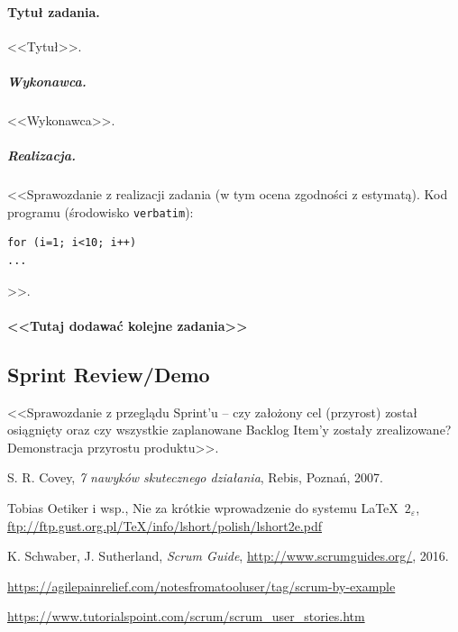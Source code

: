 \documentclass[a4paper]{article}
\begin{document}
\paragraph{Tytuł zadania.} <<Tytuł>>.
\subparagraph{Wykonawca.} <<Wykonawca>>.
\subparagraph{Realizacja.} <<Sprawozdanie z realizacji zadania (w tym ocena zgodności z estymatą). Kod programu (środowisko \texttt{verbatim}): \begin{verbatim}
for (i=1; i<10; i++)
...
\end{verbatim}>>.

\paragraph{<<Tutaj dodawać kolejne zadania>>}


\subsection{Sprint Review/Demo}
<<Sprawozdanie z przeglądu Sprint'u -- czy założony cel (przyrost) został osiągnięty oraz czy wszystkie zaplanowane Backlog Item'y zostały zrealizowane? Demonstracja przyrostu produktu>>.

\begin{thebibliography}{9}

 S. R. Covey, {\em 7 nawyków skutecznego działania}, Rebis, Poznań, 2007.

 Tobias Oetiker i wsp., Nie za krótkie wprowadzenie do systemu \LaTeX  \ $2_\varepsilon$, \url{ftp://ftp.gust.org.pl/TeX/info/lshort/polish/lshort2e.pdf}

 K. Schwaber, J. Sutherland, {\em Scrum Guide}, \url{http://www.scrumguides.org/}, 2016.

 \url{https://agilepainrelief.com/notesfromatooluser/tag/scrum-by-example}

 \url{https://www.tutorialspoint.com/scrum/scrum_user_stories.htm}

\end{thebibliography}
\end{document}
